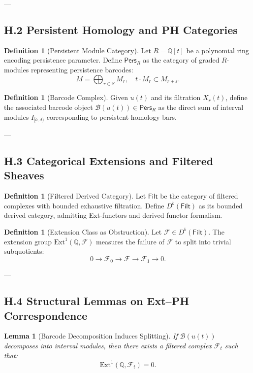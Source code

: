 \documentclass[11pt]{article}
\newtheorem{lemma}[theorem]{Lemma}
\theoremstyle{definition}
\newtheorem{definition}[theorem]{Definition}
\begin{document}
---

\subsection*{H.2 Persistent Homology and PH Categories}

\begin{definition}[Persistent Module Category]
Let $R = \mathbb{Q}[t]$ be a polynomial ring encoding persistence parameter.  
Define $\mathsf{Pers}_R$ as the category of graded $R$-modules representing persistence barcodes:
\[
M = \bigoplus_{r \in \mathbb{R}} M_r, \quad t \cdot M_r \subset M_{r+\varepsilon}.
\]
\end{definition}

\begin{definition}[Barcode Complex]
Given $u(t)$ and its filtration $X_r(t)$, define the associated barcode object $\mathcal{B}(u(t)) \in \mathsf{Pers}_R$  
as the direct sum of interval modules $I_{[b,d)}$ corresponding to persistent homology bars.
\end{definition}

---

\subsection*{H.3 Categorical Extensions and Filtered Sheaves}

\begin{definition}[Filtered Derived Category]
Let $\mathsf{Filt}$ be the category of filtered complexes with bounded exhaustive filtration.  
Define $D^b(\mathsf{Filt})$ as its bounded derived category, admitting Ext-functors and derived functor formalism.
\end{definition}

\begin{definition}[Extension Class as Obstruction]
Let $\mathcal{F} \in D^b(\mathsf{Filt})$.  
The extension group $\mathrm{Ext}^1(\mathbb{Q}, \mathcal{F})$ measures the failure of $\mathcal{F}$ to split into trivial subquotients:
\[
0 \to \mathcal{F}_0 \to \mathcal{F} \to \mathcal{F}_1 \to 0.
\]
\end{definition}

---

\subsection*{H.4 Structural Lemmas on Ext–PH Correspondence}

\begin{lemma}[Barcode Decomposition Induces Splitting]
If $\mathcal{B}(u(t))$ decomposes into interval modules, then there exists a filtered complex $\mathcal{F}_t$ such that:
\[
\mathrm{Ext}^1(\mathbb{Q}, \mathcal{F}_t) = 0.
\]
\end{lemma}
\end{document}
